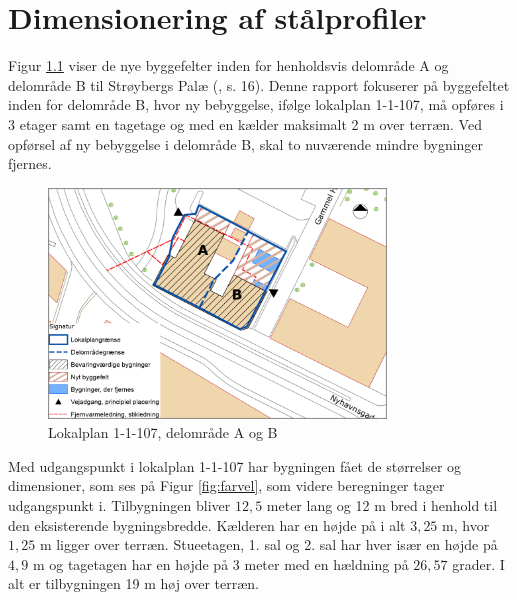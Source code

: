 \chapter{Dimensionering af stålprofiler}

Figur \ref{fig:hej} viser de nye byggefelter inden for henholdsvis delområde A og delområde B til Strøybergs Palæ (\citep{lokalplan}, s. 16). Denne rapport fokuserer på byggefeltet inden for delområde B, hvor ny bebyggelse, ifølge lokalplan 1-1-107, må opføres i 3 etager samt en tagetage og med en kælder maksimalt 2 m over terræn. Ved opførsel af ny bebyggelse i delområde B, skal to nuværende mindre bygninger fjernes. 

\begin{figure}[htbp]
	\centering
	\includegraphics[width=0.8\textwidth]{billeder/signatur.png}
	\caption{Lokalplan 1-1-107, delområde A og B \citep[ bilag 2, s. 35]{lokalplan}}
	\label{fig:hej}
\end{figure}

Med udgangspunkt i lokalplan 1-1-107 har bygningen fået de størrelser og dimensioner, som ses på Figur \ref{fig:farvel}, som videre beregninger tager udgangspunkt i.
\newline \indent{     }  Tilbygningen bliver $12,\!5$ meter lang og 12 m bred i henhold til den eksisterende bygningsbredde. Kælderen har en højde på i alt $3,\!25$ m, hvor $1,\!25$ m ligger over terræn. Stueetagen, 1. sal og 2. sal har hver især en højde på $4,\!9$ m og tagetagen har en højde på 3 meter med en hældning på $26,\!57$ grader. I alt er tilbygningen 19 m høj over terræn.


